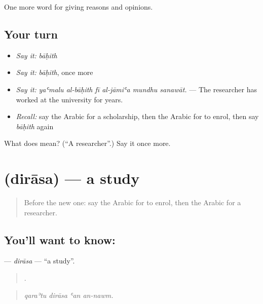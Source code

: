 \begin{grammarlens}[title={What you've built}]
One more word for giving reasons and opinions.
\end{grammarlens}

\subsection*{Your turn}
\begin{itemize}
\raggedright
  \item \emph{Say it:} \emph{bāḥith}
  \item \emph{Say it:} \emph{bāḥith}, once more
  \item \emph{Say it:} \emph{yaʿmalu al-bāḥith fī al-jāmiʿa mundhu sanawāt.} — The researcher has worked at the university for years.
  \item \emph{Recall:} say the Arabic for a scholarship, then the Arabic for to enrol, then say \emph{bāḥith} again
\end{itemize}

\begin{tcolorbox}[breakable,colback=teal!4,colframe=teal!35!black,title={Before you move on}]
What does  mean? (\textquotedblleft{}A researcher\textquotedblright{}.) Say it once more.
\end{tcolorbox}
\section[\texorpdfstring{\ar{دراسة} (dirāsa)}{دراسة (dirāsa)}]{ (dirāsa) — a study}

\label{lesson:AR-C391-dirasa}



\begin{quote}
Before the new one: say the Arabic for to enrol, then the Arabic for a researcher.
\end{quote}

\subsection*{You'll want to know: }
\textbf{} — \emph{dirāsa} — \textquotedblleft{}a study\textquotedblright{}.

\begin{quote}
   .
\end{quote}

\begin{quote}
\emph{qaraʾtu dirāsa ʿan an-nawm.}
\end{quote}


